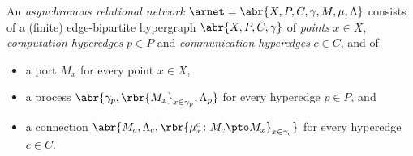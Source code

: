 \documentclass{LMCS}
\begin{document}
  \begin{defi}
    \label{definition:ARN}
    An \emph{asynchronous relational network} \(\arnet = \abr{X, P, C, \gamma, M, \mu, \Lambda}\) consists of a (finite) edge-bipartite hypergraph \(\abr{X, P, C, \gamma}\) of \emph{points} \(x \in X\), \emph{computation hyperedges} \(p \in P\) and \emph{communication hyperedges} \(c \in C\), and of
    \begin{itemize}
      
    \item a port \(M_{x}\) for every point \(x \in X\),
      
    \item a process \(\abr{\gamma_{p}, \rbr{M_{x}}_{x \in \gamma_{p}}, \Lambda_{p}}\) for every hyperedge \(p \in P\), and
      
    \item a connection \(\abr{M_{c}, \Lambda_{c}, \rbr{\mu^{c}_{x} \colon M_{c} \pto M_{x}}_{x \in \gamma_{c}}}\) for every hyperedge \(c \in C\).
      
    \end{itemize}
  \end{defi}
\end{document}
